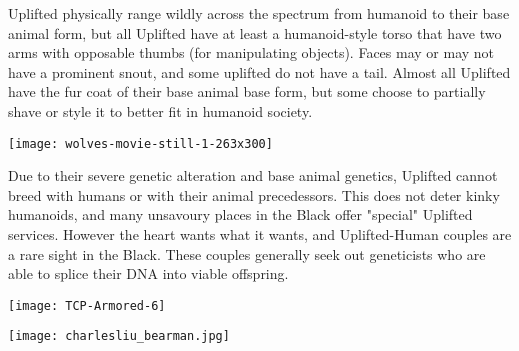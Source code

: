 \columnbreak

Uplifted physically range wildly across the spectrum from humanoid to their base animal form, but all Uplifted have at least a humanoid-style torso that have two arms with opposable thumbs (for manipulating objects). Faces may or may not have a prominent snout, and some uplifted do not have a tail. Almost all Uplifted have the fur coat of their base animal base form, but some choose to partially shave or style it to better fit in humanoid society.

\texttt{[image: wolves-movie-still-1-263x300]}

Due to their severe genetic alteration and base animal genetics, Uplifted cannot breed with humans or with their animal precedessors. This does not deter kinky humanoids, and many unsavoury places in the Black offer "special" Uplifted services. However the heart wants what it wants, and Uplifted-Human couples are a rare sight in the Black. These couples generally seek out geneticists who are able to splice their DNA into viable offspring.

\texttt{[image: TCP-Armored-6]}

\texttt{[image: charlesliu\_bearman.jpg]}

